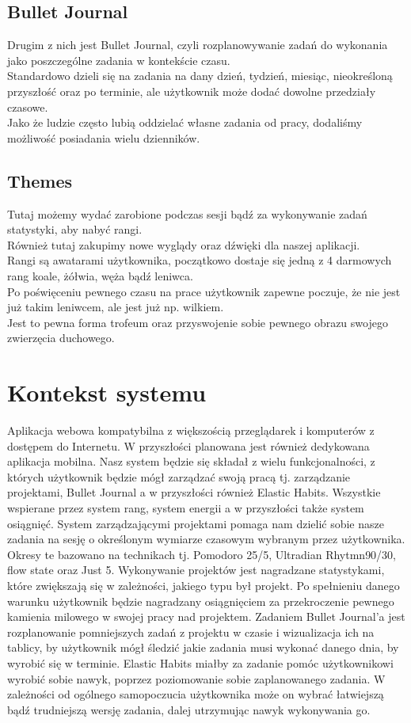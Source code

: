 \documentclass[a4paper,11pt]{report}
\begin{document}
\subsection{Bullet Journal}
Drugim z nich jest Bullet Journal, czyli rozplanowywanie zadań do wykonania jako poszczególne zadania w kontekście czasu.
\\Standardowo dzieli się na zadania na dany dzień, tydzień, miesiąc, nieokreśloną przyszłość oraz po terminie, ale użytkownik może dodać dowolne przedziały czasowe.
\\Jako że ludzie często lubią oddzielać własne zadania od pracy, dodaliśmy możliwość posiadania wielu dzienników.
\subsection{Themes}
Tutaj możemy wydać zarobione podczas sesji bądź za wykonywanie zadań statystyki, aby nabyć rangi.
\\Również tutaj zakupimy nowe wyglądy oraz dźwięki dla naszej aplikacji.
\\Rangi są awatarami użytkownika, początkowo dostaje się jedną z 4 darmowych rang koale, żółwia, węża bądź leniwca.
\\Po poświęceniu pewnego czasu na prace użytkownik zapewne poczuje, że nie jest już takim leniwcem, ale jest już np. wilkiem.
\\Jest to pewna forma trofeum oraz przyswojenie sobie pewnego obrazu swojego zwierzęcia duchowego.

\section {Kontekst systemu}
Aplikacja webowa kompatybilna z większością przeglądarek i komputerów z dostępem do Internetu.
W przyszłości planowana jest również dedykowana aplikacja mobilna.
 Nasz system będzie się składał z wielu funkcjonalności,
 z których użytkownik będzie mógł zarządzać swoją pracą tj. zarządzanie projektami,
 Bullet Journal a w przyszłości również Elastic Habits\cite{elastic}\cite{elasticHabits}.
 Wszystkie wspierane przez system rang, system energii a w przyszłości także system osiągnięć.
 System zarządzającymi projektami pomaga nam dzielić sobie nasze zadania na sesję o określonym wymiarze
 czasowym wybranym przez użytkownika.
 Okresy te bazowano na technikach tj. Pomodoro\cite{Pomodoro} 25/5, Ultradian Rhytmn\cite{90/30}90/30,
 flow state\cite{flow}\cite{flowState} oraz Just 5\cite{just5}\cite{just5_}.
 Wykonywanie projektów jest nagradzane statystykami, które zwiększają się w zależności, jakiego typu był projekt.
 Po spełnieniu danego warunku użytkownik będzie nagradzany osiągnięciem za przekroczenie pewnego kamienia milowego
 w swojej pracy nad projektem.
 Zadaniem Bullet Journal’a jest rozplanowanie pomniejszych zadań z projektu w czasie i wizualizacja ich na tablicy,
 by użytkownik mógł śledzić jakie zadania musi wykonać danego dnia, by wyrobić się w terminie.
 Elastic Habits miałby za zadanie pomóc użytkownikowi wyrobić sobie nawyk,
 poprzez poziomowanie sobie zaplanowanego zadania.
 W zależności od ogólnego samopoczucia użytkownika może on wybrać łatwiejszą bądź trudniejszą wersję zadania, dalej utrzymując nawyk wykonywania go. \\
\end{document}
